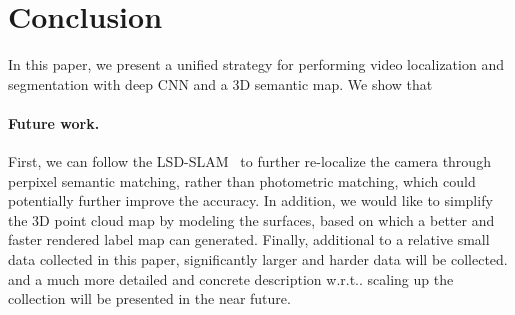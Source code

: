 \documentclass[10pt,twocolumn,letterpaper]{article}
\makeatletter
\DeclareRobustCommand\onedot{\futurelet\@let@token\@onedot}
\def\onedot{\ifx\@let@token.\else.\null\fi\xspace}
\def\wrt{w.r.t\onedot}
\makeatother
\begin{document}
\section{Conclusion}
\label{sec:conclusion}
In this paper, we present a unified strategy for performing video localization and segmentation with deep CNN and a 3D semantic map. We show that 

\paragraph{Future work.} First, we can follow the LSD-SLAM~\cite{engel2014lsd} to further re-localize the camera through perpixel semantic matching, rather than photometric matching, which could potentially further improve the accuracy. In addition, we would like to simplify the 3D point cloud map by modeling the surfaces, based on which a better and faster rendered label map can generated.
Finally, additional to a relative small data collected in this paper, significantly larger and harder data will be collected. and a much more detailed and concrete description \wrt scaling up the collection will be presented in the near future. 

% 
{\small


}
\end{document}
